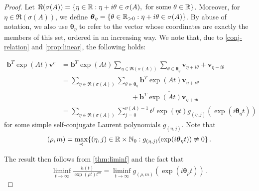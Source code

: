\begin{proof}
  Let
  $\Re(\sigma(A))=\lbrace \eta\in\mathbb{R}:
  \eta+i\theta\in\sigma(A),\mbox{ for some }\theta\in\mathbb{R}
  \rbrace$. Moreover, for $\eta\in\Re(\sigma(A))$, we define
  $\boldsymbol{\theta}_{\eta}=\lbrace \theta\in\mathbb{R}_{>0}:
  \eta+i\theta \in\sigma(A) \rbrace$. By abuse of notation, we also
  use $\boldsymbol{\theta}_{\eta}$ to refer to the vector whose
  coordinates are exactly the members of this set, ordered in an
  increasing way. We note that, due to \cref{conj-relation}
  and \cref{prop:linear}, the
  following holds:

\begin{align*}
\boldsymbol{b}^{T}\exp(At)\boldsymbol{v}^{c} &= \boldsymbol{b}^{T} \exp(At) \sum\limits_{\eta\in\Re(\sigma(A))} \sum\limits_{\theta\in\boldsymbol{\theta}_{\eta}} \boldsymbol{v}_{\eta+i\theta}+\boldsymbol{v}_{\eta-i\theta} \\
&= \sum\limits_{\eta\in\Re(\sigma(A))} \sum\limits_{\theta\in\boldsymbol{\theta}_{\eta}} \boldsymbol{b}^{T} \exp(At) \boldsymbol{v}_{\eta+i\theta} \\
& \qquad \qquad \qquad \qquad \qquad + \overline{\boldsymbol{b}^{T} \exp(At) \boldsymbol{v}_{\eta+i\theta}} \\
& = \sum\limits_{\eta\in\Re(\sigma(A))} \sum\limits_{j=0}^{\nu(A)-1} t^{j}\exp(\eta t)  g_{(\eta,j)}( \exp(i\boldsymbol{\theta}_{\eta}t) )
\end{align*}
for some simple self-conjugate Laurent polynomials
$g_{(\eta,j)}$.
Note that
\begin{equation*}
(\rho,m)=\max\limits_{\prec} \lbrace (\eta,j)\in\mathbb{R}\times
\mathbb{N}_{0}: g_{(\eta,j)}(\exp(i\boldsymbol{\theta}_{\eta} t)) \not
\equiv 0 \rbrace \, .
\end{equation*}

The result then follows from \cref{thm:liminf} and the fact
that
\begin{align*}
\liminf\limits_{t\rightarrow\infty} \frac{h(t)}{\exp(\rho t)t^{m}}=
  \liminf\limits_{t\rightarrow\infty}
  g_{(\rho,m)}(\exp(i\boldsymbol{\theta}_{\rho} t)) \, .
\end{align*}
\end{proof}
